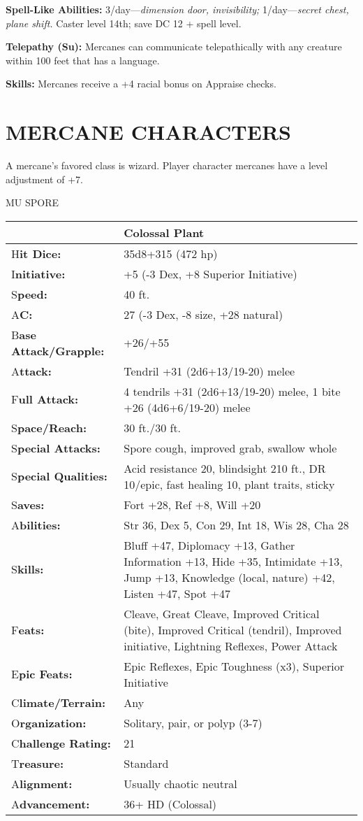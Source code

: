 \documentclass{article}
\begin{document}
{\textbf{Spell-Like Abilities: }3/day---\textit{dimension door, invisibility; }1/day---\textit{secret 
chest, plane shift. }Caster level 14th; save DC 12 + spell level. 

\textbf{Telepathy (Su):} Mercanes can communicate telepathically with any creature 
within 100 feet that has a language. 

\textbf{Skills:} Mercanes receive a +4 racial bonus on Appraise checks. 

\vspace{12pt}
\section*{MERCANE CHARACTERS }

A mercane's favored class is wizard. Player character mercanes have a level adjustment 
of +7. 

\vspace{12pt}
{\LARGE{}MU SPORE }

\begin{tabular}{|>{\raggedright}p{66pt}|>{\raggedright}p{259pt}|}
\hline
  & Colossal Plant \tabularnewline
\hline
H\textbf{it Dice:} & 35d8+315 (472 hp) \tabularnewline
\hline
I\textbf{nitiative:} & +5 (-3 Dex, +8 Superior Initiative) \tabularnewline
\hline
S\textbf{peed:} & 40 ft. \tabularnewline
\hline
A\textbf{C:} & 27 (-3 Dex, -8 size, +28 natural) \tabularnewline
\hline
B\textbf{ase Attack/Grapple:} & +26/+55\tabularnewline
\hline
A\textbf{ttack:} & Tendril +31 (2d6+13/19-20) melee\tabularnewline
\hline
F\textbf{ull Attack:} & 4 tendrils +31 (2d6+13/19-20) melee, 1 bite +26 (4d6+6/19-20) 
melee\tabularnewline
\hline
S\textbf{pace/Reach:} & 30 ft./30 ft. \tabularnewline
\hline
S\textbf{pecial Attacks:} & Spore cough, improved grab, swallow whole \tabularnewline
\hline
S\textbf{pecial Qualities:} & Acid resistance 20, blindsight 210 ft., DR 10/epic, 
fast healing 10, plant traits, sticky\tabularnewline
\hline
S\textbf{aves:} & Fort +28, Ref +8, Will +20 \tabularnewline
\hline
A\textbf{bilities:} & Str 36, Dex 5, Con 29, Int 18, Wis 28, Cha 28 \tabularnewline
\hline
S\textbf{kills:} & Bluff +47, Diplomacy +13, Gather Information +13, Hide +35, 
Intimidate +13, Jump +13, Knowledge (local, nature) +42, Listen +47, Spot +47\tabularnewline
\hline
F\textbf{eats:} & Cleave, Great Cleave, Improved Critical (bite), Improved Critical 
(tendril), Improved initiative, Lightning Reflexes, Power Attack\tabularnewline
\hline
E\textbf{pic Feats:} & Epic Reflexes, Epic Toughness (x3), Superior Initiative\tabularnewline
\hline
C\textbf{limate/Terrain:} & Any \tabularnewline
\hline
O\textbf{rganization:} & Solitary, pair, or polyp (3-7) \tabularnewline
\hline
C\textbf{hallenge Rating:} & 21 \tabularnewline
\hline
T\textbf{reasure:} & Standard \tabularnewline
\hline
A\textbf{lignment:} & Usually chaotic neutral \tabularnewline
\hline
A\textbf{dvancement:} & 36+ HD (Colossal) \tabularnewline
\hline
\end{tabular}

}
\end{document}
